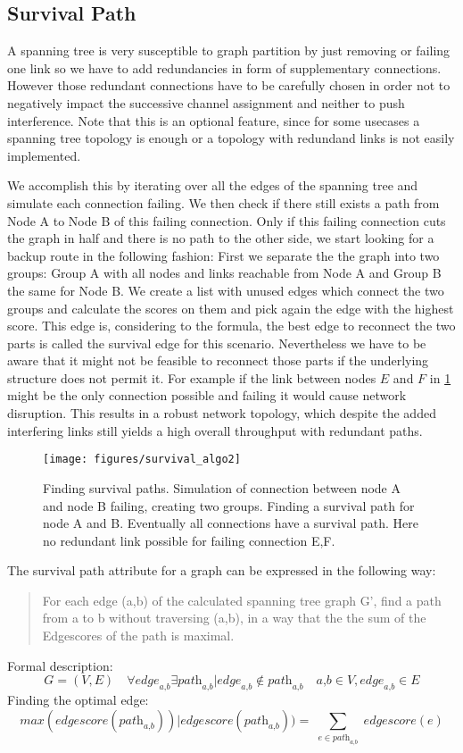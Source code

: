   \subsection{Survival Path}
  A spanning tree is very susceptible to graph partition by just removing or failing one link so we have to add redundancies in form of supplementary connections.
  However those redundant connections have to be carefully chosen in order not to negatively impact the successive channel assignment and neither to push interference.
  Note that this is an optional feature, since for some usecases a spanning tree topology is enough or a topology with redundand links is not easily implemented.  
  
  We accomplish this by iterating over all the edges of the spanning tree and simulate each connection failing. We then check if there still exists 
  a path from Node A to Node B of this failing connection. Only if this failing connection cuts the graph in half and there is no path to the other side,
  we start looking for a backup route in the following fashion:
  First we separate the the graph into two groups: Group A with all nodes and links reachable from Node A and Group B the same for Node B.
  We create a list with unused edges which connect the two groups and calculate the scores on them and pick again the edge with the highest score.
  This edge is, considering to the formula, the best edge to reconnect the two parts is called the survival edge for this scenario.
  Nevertheless we have to be aware that it might not be feasible to reconnect those parts if the underlying structure does not permit it.
  For example if the link between nodes \(E\) and \(F\) in \ref{fig:survival_algo} might be the only connection possible and failing it would cause network disruption.
  This results in a robust network topology, which despite the added interfering links still yields a high overall throughput with redundant paths.
  \begin{figure}[h]
    \centering
    \texttt{[image: figures/survival\_algo2]}
    \caption{Finding survival paths. Simulation of connection between node A and node B failing, creating two groups.
    Finding a survival path for node A and B. Eventually all connections have a survival path. Here no redundant link possible for failing connection E,F.}
    \label{fig:survival_algo}
  \end{figure}
  The survival path attribute for a graph can be expressed in the following way:
  \begin{quote}
For each edge (a,b) of the calculated spanning tree graph G', find a path from a to b without traversing (a,b), 
in a way that the the sum of the Edgescores of the path is maximal.
  \end{quote}
  Formal description:
  $$\textit{G}=(\textit{V},\textit{E}) \quad
    \forall \textit{edge}_\textit{a,b} \exists \textit{path}_\textit{a,b} | \textit{edge}_\textit{a,b} \notin \textit{path}_\textit{a,b} \quad
    \textit{a,b} \in \textit{V}, \textit{edge}_\textit{a,b} \in \textit{E}$$
    Finding the optimal edge:
    $$\textit{max}(\textit{edgescore}(\textit{path}_\textit{a,b})) |
    \textit{edgescore}(\textit{path}_\textit{a,b})) = \sum_{\substack{e \in \textit{path}_\textit{a,b}}} \textit{edgescore}(e)$$

